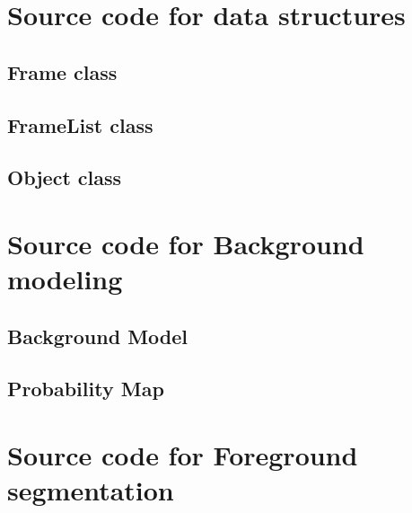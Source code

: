 \documentclass[10pt, a4paper, twoside]{article}
\numberwithin{equation}{section}
\numberwithin{figure}{section}
\begin{document}
\section{Source code for data structures}
\subsection{Frame class}
\label{sec:Frame_code}

\newpage


\subsection{FrameList class}
\label{sec:FrameList_code}

\newpage


\subsection{Object class}
\label{sec:Object_code}

\newpage



\newpage
\section{Source code for Background modeling}
\label{sec:BGMod_code}
\subsection{Background Model}


\newpage
\subsection{Probability Map}
\label{sec:ProbMap_code}

\newpage


\newpage
\section{Source code for Foreground segmentation}
\label{sec:ForeGroundSeg_code}

\newpage

\end{document}
